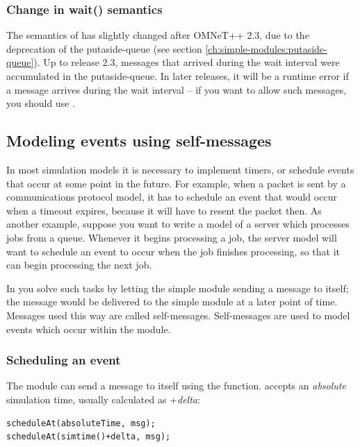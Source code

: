 \subsubsection{Change in wait() semantics}

The semantics of  has slightly changed after OMNeT++ 2.3,
due to the deprecation of the putaside-queue
(see section \ref{ch:simple-modules:putaside-queue}).
Up to release 2.3, messages that arrived during the wait interval
were accumulated in the putaside-queue. In later releases,
it will be a runtime error if a message arrives during the wait interval --
if you want to allow such messages, you should use .



\subsection{Modeling events using self-messages}
\label{sec:ch-sim-lib:self-messages}

In most simulation models it is necessary to implement timers,
or schedule events that occur at some point in the future.
For example, when a packet is sent by a communications protocol model,
it has to schedule an event that would occur when a timeout expires,
because it will have to resent the packet then.
As another example, suppose you want to write a model of a server which
processes jobs from a queue. Whenever it begins processing
a job, the server model will want to schedule an event to occur
when the job finishes processing, so that it can begin processing
the next job.

In {\opp} you solve such tasks by letting the simple module
sending a message to itself; the message would be delivered
to the simple module at a later point of time. Messages used
this way are called self-messages.
Self-messages are used to model events which occur within the module.

\subsubsection{Scheduling an event}

The module can send a message to itself using the  function.
 accepts an \textit{absolute} simulation time,
usually calculated as +\textit{delta}:

\begin{verbatim}
scheduleAt(absoluteTime, msg);
scheduleAt(simtime()+delta, msg);
\end{verbatim}

